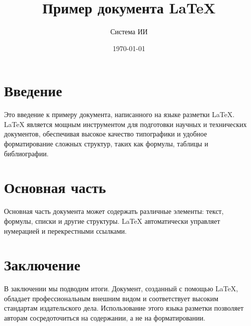 \documentclass{article}
\title{Пример документа LaTeX}
\author{Система ИИ}
\date{\today}
\begin{document}
\maketitle

\section{Введение}
Это введение к примеру документа, написанного на языке разметки LaTeX. LaTeX является мощным инструментом для подготовки научных и технических документов, обеспечивая высокое качество типографики и удобное форматирование сложных структур, таких как формулы, таблицы и библиографии.

\section{Основная часть}
Основная часть документа может содержать различные элементы: текст, формулы, списки и другие структуры. LaTeX автоматически управляет нумерацией и перекрестными ссылками.

\section{Заключение}
В заключении мы подводим итоги. Документ, созданный с помощью LaTeX, обладает профессиональным внешним видом и соответствует высоким стандартам издательского дела. Использование этого языка разметки позволяет авторам сосредоточиться на содержании, а не на форматировании.
\end{document}
